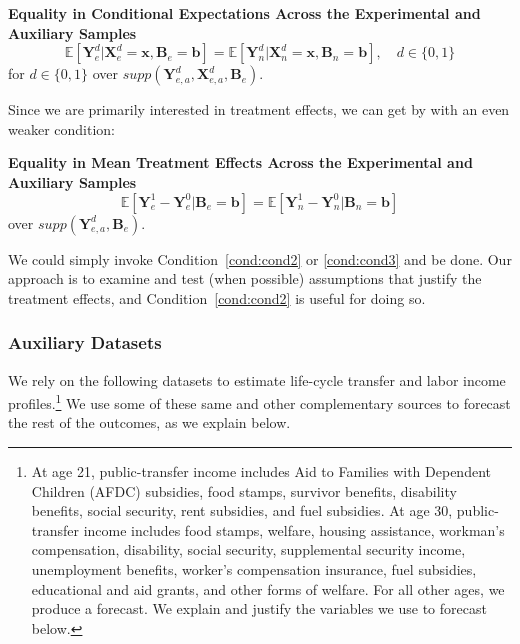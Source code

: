 \onehalfspacing
\begin{condition} \textbf{Equality in Conditional Expectations Across the Experimental and Auxiliary Samples \label{cond:cond2}}
\begin{equation}
\mathbb{E} \left[ \bm{Y}_e^d |  \bm{X}_e^d = \bm{x}, \bm{B}_e = \bm{b} \right] = \mathbb{E} \left[ \bm{Y}_n^d |  \bm{X}_n^d = \bm{x}, \bm{B}_n = \bm{b} \right], \quad d \in \{0,1\}
\end{equation}
for $d \in \{0, 1 \}$ over $supp\left(\bm{Y}^d_{e,a}, \bm{X}^d_{e,a}, \bm{B}_e\right)$.
\end{condition}
\doublespacing

\noindent Since we are primarily interested in treatment effects, we can get by with an even weaker condition:

\onehalfspacing
\begin{condition} \textbf{Equality in Mean Treatment Effects Across the Experimental and Auxiliary Samples \label{cond:cond3}}
\begin{equation}
\mathbb{E} \left[ \bm{Y}_e^1 - \bm{Y}_e^0 | \bm{B}_e = \bm{b} \right] = \mathbb{E} \left[ \bm{Y}_n^1 - \bm{Y}_n^0 | \bm{B}_n = \bm{b} \right]
\end{equation}
over $supp\left(\bm{Y}^d_{e,a}, \bm{B}_e\right)$.\footnotemark
\end{condition}
\doublespacing
We could simply invoke Condition~\ref{cond:cond2} or \ref{cond:cond3} and be done. Our approach is to examine and test (when possible) assumptions that justify the treatment effects, and Condition~\ref{cond:cond2} is useful for doing so.

\subsubsection{Auxiliary Datasets} \label{app:datasets}

\noindent We rely on the following datasets to estimate life-cycle transfer and labor income profiles.\footnote{At age 21, public-transfer income includes Aid to Families with Dependent Children (AFDC) subsidies, food stamps, survivor benefits, disability benefits, social security, rent subsidies, and fuel subsidies. At age 30, public-transfer income includes food stamps, welfare, housing assistance, workman's compensation, disability, social security, supplemental security income, unemployment benefits, worker's compensation insurance, fuel subsidies, educational and aid grants, and other forms of welfare. For all other ages, we produce a forecast. We explain and justify the variables we use to forecast below.} We use some of these same and other complementary sources to forecast the rest of the outcomes, as we explain below.

